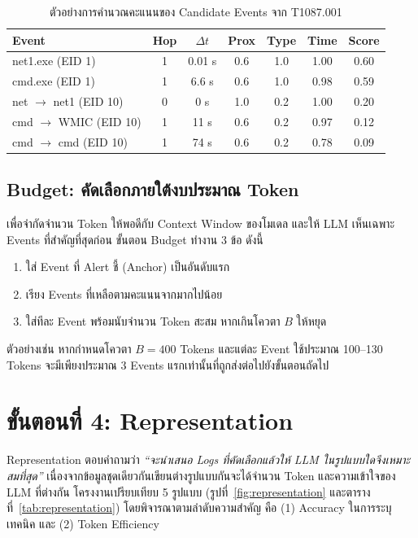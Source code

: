 \begin{table}[ht]
  \centering
  \caption{ตัวอย่างการคำนวณคะแนนของ Candidate Events จาก T1087.001}
  \label{tab:score-example}
  \begin{tabular}{|l|c|c|c|c|c|c|}
    \hline
    \textbf{Event} & \textbf{Hop} & \textbf{$\Delta t$} & \textbf{Prox} & \textbf{Type} & \textbf{Time} & \textbf{Score} \\ \hline
    net1.exe (EID 1)         & 1 & 0.01 s & 0.6 & 1.0 & 1.00 & 0.60 \\ \hline
    cmd.exe (EID 1)          & 1 & 6.6 s  & 0.6 & 1.0 & 0.98 & 0.59 \\ \hline
    net $\rightarrow$ net1 (EID 10) & 0 & 0 s & 1.0 & 0.2 & 1.00 & 0.20 \\ \hline
    cmd $\rightarrow$ WMIC (EID 10) & 1 & 11 s & 0.6 & 0.2 & 0.97 & 0.12 \\ \hline
    cmd $\rightarrow$ cmd (EID 10)  & 1 & 74 s & 0.6 & 0.2 & 0.78 & 0.09 \\ \hline
  \end{tabular}
\end{table}

\subsection{Budget: คัดเลือกภายใต้งบประมาณ Token}
เพื่อจำกัดจำนวน Token ให้พอดีกับ Context Window ของโมเดล และให้ LLM เห็นเฉพาะ Events ที่สำคัญที่สุดก่อน
ขั้นตอน Budget ทำงาน 3 ข้อ ดังนี้
\begin{enumerate}
  \item ใส่ Event ที่ Alert ชี้ (Anchor) เป็นอันดับแรก
  \item เรียง Events ที่เหลือตามคะแนนจากมากไปน้อย
  \item ใส่ทีละ Event พร้อมนับจำนวน Token สะสม หากเกินโควตา $B$ ให้หยุด
\end{enumerate}
ตัวอย่างเช่น หากกำหนดโควตา $B = 400$ Tokens และแต่ละ Event ใช้ประมาณ 100--130 Tokens
จะมีเพียงประมาณ 3 Events แรกเท่านั้นที่ถูกส่งต่อไปยังขั้นตอนถัดไป

\section{ขั้นตอนที่ 4: Representation}

Representation ตอบคำถามว่า \emph{``จะนำเสนอ Logs ที่คัดเลือกแล้วให้ LLM ในรูปแบบใดจึงเหมาะสมที่สุด''}
เนื่องจากข้อมูลชุดเดียวกันเขียนต่างรูปแบบกันจะได้จำนวน Token และความเข้าใจของ LLM ที่ต่างกัน
โครงงานเปรียบเทียบ 5 รูปแบบ (รูปที่~\ref{fig:representation} และตารางที่~\ref{tab:representation})
โดยพิจารณาตามลำดับความสำคัญ คือ (1) Accuracy ในการระบุเทคนิค และ (2) Token Efficiency

